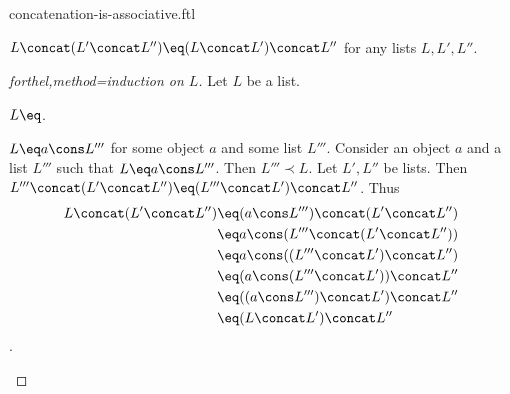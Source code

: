 \documentclass{naproche-library}
\begin{document}
\begin{smodule}[title=Concatenation is Associative]{concatenation-is-associative.ftl}

\begin{proposition}[forthel,id=ConcatIsAssociativeProp]
  $L \concat (L' \concat L'') \eq (L \concat L') \concat L''$ for any lists $L, L', L''$.
\end{proposition}
\begin{proof}[forthel,method=induction on $L$]
  Let $L$ be a list.

  \begin{case}{$L \eq \list{}$.} \end{case}

  \begin{case}{$L \eq a \cons L'''$ for some object $a$ and some list $L'''$.}
    Consider an object $a$ and a list $L'''$ such that $L \eq a \cons L'''$.
    Then $L''' \prec L$.
    Let $L',L''$ be lists.
    Then $L''' \concat (L' \concat L'') \eq (L''' \concat L') \concat L''$.
    Thus
    \begin{align*}
      L \concat (L' \concat L'') 
        &\eq (a \cons L''') \concat (L' \concat L'')\\
        &\eq a \cons (L''' \concat (L' \concat L''))\\
        &\eq a \cons ((L''' \concat L') \concat L'')\\
        &\eq (a \cons (L''' \concat L')) \concat L''\\
        &\eq ((a \cons L''') \concat L') \concat L''\\
        &\eq (L \concat L') \concat L''
    \end{align*}.
  \end{case}
\end{proof}
\end{smodule}
\end{document}
